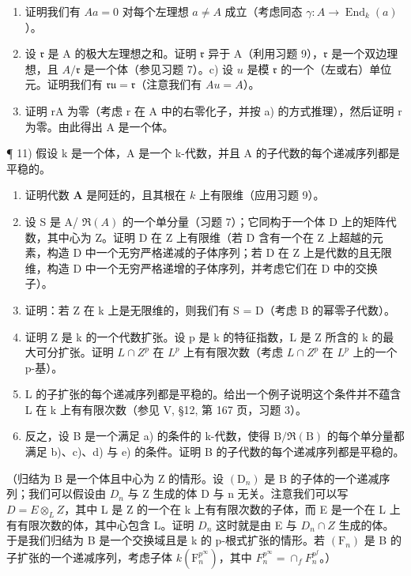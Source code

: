 \begin{enumerate}
\def\labelenumi{\alph{enumi})}
\item
  证明我们有 \(Aa = 0\) 对每个左理想 \(a \neq A\) 成立（考虑同态 \(\gamma : A \to \operatorname{End}_{k}(a)\)）。
\item
  设 \(\mathfrak{r}\) 是 A 的极大左理想之和。证明 \(\mathfrak{r}\) 异于 A（利用习题 9），\(\mathfrak{r}\) 是一个双边理想，且 \(A / \mathfrak{r}\) 是一个体（参见习题 7）。c) 设 \(u\) 是模 \(\mathfrak{r}\) 的一个（左或右）单位元。证明我们有 \(\mathfrak{ru} = \mathfrak{r}\)（注意我们有 \(Au = A\)）。
\item
  证明 rA 为零（考虑 r 在 A 中的右零化子，并按 a) 的方式推理），然后证明 r 为零。由此得出 A 是一个体。
\end{enumerate}

¶ 11) 假设 k 是一个体，A 是一个 k-代数，并且 A 的子代数的每个递减序列都是平稳的。

\begin{enumerate}
\def\labelenumi{\alph{enumi})}
\item
  证明代数 \(\mathbf{A}\) 是阿廷的，且其根在 \(k\) 上有限维（应用习题 9）。
\item
  设 S 是 A/ \(\Re(A)\) 的一个单分量（习题 7）；它同构于一个体 D 上的矩阵代数，其中心为 Z。证明 D 在 Z 上有限维（若 D 含有一个在 Z 上超越的元素，构造 D 中一个无穷严格递减的子体序列；若 D 在 Z 上是代数的且无限维，构造 D 中一个无穷严格递增的子体序列，并考虑它们在 D 中的交换子）。
\item
  证明：若 Z 在 k 上是无限维的，则我们有 S = D（考虑 B 的幂零子代数）。
\item
  证明 Z 是 k 的一个代数扩张。设 p 是 k 的特征指数，L 是 Z 所含的 k 的最大可分扩张。证明 \(L \cap Z^{p}\) 在 \(L^{p}\) 上有有限次数（考虑 \(L \cap Z^{p}\) 在 \(L^{p}\) 上的一个 p-基）。
\item
  L 的子扩张的每个递减序列都是平稳的。给出一个例子说明这个条件并不蕴含 L 在 k 上有有限次数（参见 V, §12, 第 167 页，习题 3）。
\item
  反之，设 B 是一个满足 a) 的条件的 k-代数，使得 \(\mathrm{B}/\Re(\mathrm{B})\) 的每个单分量都满足 b)、c)、d) 与 e) 的条件。证明 B 的子代数的每个递减序列都是平稳的。
\end{enumerate}

（归结为 B 是一个体且中心为 Z 的情形。设 \((\mathrm{D}_{n})\) 是 B 的子体的一个递减序列；我们可以假设由 \(D_{n}\) 与 Z 生成的体 D 与 n 无关。注意我们可以写 \(D = E \otimes_{L} Z\)，其中 L 是 Z 的一个在 k 上有有限次数的子体，而 E 是一个在 L 上有有限次数的体，其中心包含 L。证明 \(D_{n}\) 这时就是由 E 与 \(D_{n} \cap Z\) 生成的体。于是我们归结为 B 是一个交换域且是 k 的 p-根式扩张的情形。若 \((\mathrm{F}_{n})\) 是 B 的子扩张的一个递减序列，考虑子体 \(k(\mathrm{F}_{n}^{p^{\infty}})\)，其中 \(F_{n}^{p^{\infty}} = \cap_{f} F_{n}^{p^{f}}\)。）

